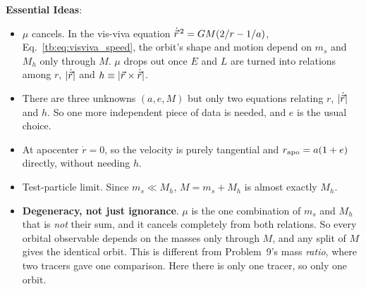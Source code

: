 \textbf{Essential Ideas}:
\begin{itemize}
	\item $\mu$ cancels. In the vis-viva equation $\dot{\vec r}^{\,2}=GM(2/r-1/a)$, Eq.~\eqref{tb:eq:visviva_speed}, the orbit's shape and motion depend on $m_s$ and $M_h$ only through $M$. $\mu$ drops out once $E$ and $L$ are turned into relations among $r$, $|\dot{\vec r}|$ and $h\equiv|\vec r\times\dot{\vec r}|$.
	\item There are three unknowns $(a,e,M)$ but only two equations relating $r$, $|\dot{\vec r}|$ and $h$. So one more independent piece of data is needed, and $e$ is the usual choice.
	\item At apocenter $\dot r=0$, so the velocity is purely tangential and $r_{\rm apo}=a(1+e)$ directly, without needing $h$.
	\item Test-particle limit. Since $m_s\ll M_h$, $M=m_s+M_h$ is almost exactly $M_h$.
	\item \textbf{Degeneracy, not just ignorance}. $\mu$ is the one combination of $m_s$ and $M_h$ that is \emph{not} their sum, and it cancels completely from both relations. So every orbital observable depends on the masses only through $M$, and any split of $M$ gives the identical orbit. This is different from Problem~9's mass \emph{ratio}, where two tracers gave one comparison. Here there is only one tracer, so only one orbit.
\end{itemize}

